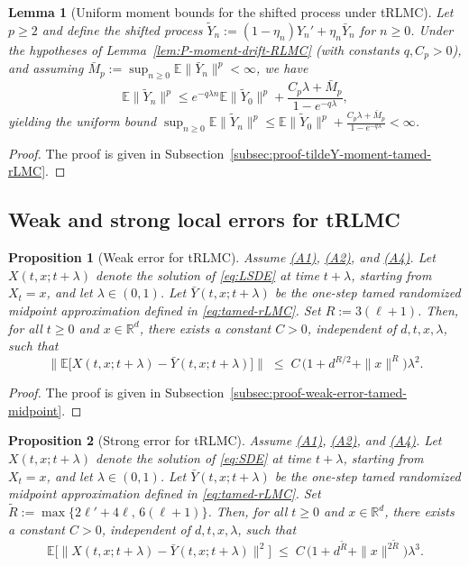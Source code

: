 \documentclass[11pt,a4paper,reqno]{amsart}
\theoremstyle{plain}
\newtheorem{lemma}{Lemma}
\newtheorem{proposition}{Proposition}
\theoremstyle{definition}
\theoremstyle{remark}
\newcommand{\R}{\mathbb{R}}
\newcommand{\E}{\mathbb{E}}
\begin{document}
\begin{lemma}[Uniform moment bounds for the shifted process under tRLMC]\label{lem:tildeY-moment-tamed-rLMC}
Let $p\ge 2$ and define the shifted process $\widetilde Y_n := (1-\eta_n)Y_n' + \eta_n \bar Y_n$ for $n\ge0$. Under the hypotheses of Lemma~\ref{lem:P-moment-drift-RLMC} (with constants $q, C_p > 0$), and assuming $\bar M_p := \sup_{n\ge 0} \E\|\bar Y_n\|^p < \infty$, we have
\[
  \E\|\widetilde Y_n\|^p \le e^{-q\lambda n}\E\|\widetilde Y_0\|^p + \frac{C_p\lambda+\bar M_p}{1-e^{-q\lambda}},
\]
yielding the uniform bound $\sup_{n\ge 0} \E\|\widetilde Y_n\|^p \le \E\|\widetilde Y_0\|^p + \frac{C_p\lambda+\bar M_p}{1-e^{-q\lambda}} < \infty$.
\end{lemma}

\begin{proof}
The proof is given in Subsection~\ref{subsec:proof-tildeY-moment-tamed-rLMC}.
\end{proof}



\subsection{Weak and strong local errors for tRLMC}

\begin{proposition}[Weak error for tRLMC]
\label{prop:weak-error-tamed-midpoint}
Assume \hyperref[ass:PJG]{\textup{(A1)}}, \hyperref[ass:PLC]{\textup{(A2)}}, and
\hyperref[ass:D]{\textup{(A4)}}. Let \(X(t,x;t+\lambda)\) denote the solution of
\eqref{eq:LSDE} at time \(t+\lambda\), starting from \(X_t=x\), and let \(\lambda\in(0,1)\). Let \(\bar Y(t,x;t+\lambda)\) be the one-step \emph{tamed randomized midpoint} approximation
defined in \eqref{eq:tamed-rLMC}. Set $R := 3(\ell+1)$.
Then, for all \(t\ge0\) and \(x\in\R^d\), there exists a constant \(C>0\),
independent of \(d,t,x,\lambda\), such that
\[
  \bigl\|\E\!\bigl[X(t,x;t+\lambda)-\bar Y(t,x;t+\lambda)\bigr]\bigr\|
  \;\le\;
  C\,\bigl(1+d^{R/2}+\|x\|^{R}\bigr)\lambda^{2}.
\]
\end{proposition}

\begin{proof}
The proof is given in Subsection~\ref{subsec:proof-weak-error-tamed-midpoint}.
\end{proof}

\begin{proposition}[Strong error for tRLMC]
\label{prop:strong-error-tamed-midpoint}
Assume \hyperref[ass:PJG]{\textup{(A1)}}, \hyperref[ass:PLC]{\textup{(A2)}}, and \hyperref[ass:D]{\textup{(A4)}}. Let \(X(t,x;t+\lambda)\) denote the solution of
\eqref{eq:SDE} at time \(t+\lambda\), starting from \(X_t=x\), and let \(\lambda\in(0,1)\). Let \(\bar Y(t,x;t+\lambda)\) be the one-step \emph{tamed randomized midpoint} approximation
defined in \eqref{eq:tamed-rLMC}. Set $\widetilde R := \max\{2\ell'+4\ell,\, 6(\ell+1)\}$.
Then, for all \(t\ge0\) and \(x\in\R^d\), there exists a constant \(C>0\),
independent of \(d,t,x,\lambda\), such that
\[
  \E\bigl[\|X(t,x;t+\lambda)-\bar Y(t,x;t+\lambda)\|^2\bigr]
  \;\le\;
  C\,\bigl(1+d^{\widetilde R}+\|x\|^{2\widetilde R}\bigr)\lambda^{3}.
\]
\end{proposition}
\end{document}
